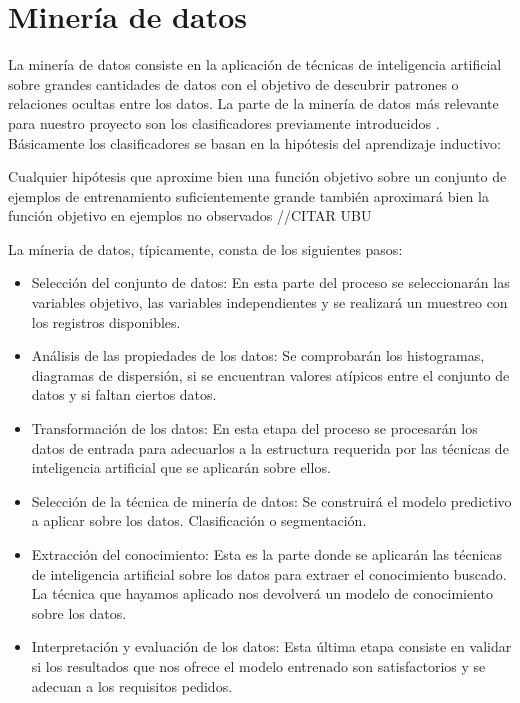 \section{Minería de datos}

La minería de datos consiste en la aplicación de técnicas de inteligencia artificial sobre grandes cantidades de datos con el objetivo de descubrir patrones o relaciones ocultas entre los datos. La parte de la minería de datos más relevante para nuestro proyecto son los clasificadores previamente introducidos \cite{procesosMineriaDatos}. Básicamente los clasificadores se basan en la hipótesis del aprendizaje inductivo:

Cualquier hipótesis que aproxime bien una función objetivo sobre un conjunto de ejemplos de entrenamiento suficientemente grande también aproximará bien la función objetivo en ejemplos no observados //CITAR UBU

La míneria de datos, típicamente, consta de los siguientes pasos:
\begin{itemize}
	\item{Selección del conjunto de datos}: En esta parte del proceso se seleccionarán las variables objetivo, las variables independientes y se realizará un muestreo con los registros disponibles.
	\item{Análisis de las propiedades de los datos}: Se comprobarán los histogramas, diagramas de dispersión, si se encuentran valores atípicos entre el conjunto de datos y si faltan ciertos datos.
	\item{Transformación de los datos}: En esta etapa del proceso se procesarán los datos de entrada para adecuarlos a la estructura requerida por las técnicas de inteligencia artificial que se aplicarán sobre ellos.
	\item{Selección de la técnica de minería de datos}: Se construirá el modelo predictivo a aplicar sobre los datos. Clasificación o segmentación.
	\item{Extracción del conocimiento}: Esta es la parte donde se aplicarán las técnicas de inteligencia artificial sobre los datos para extraer el conocimiento buscado. La técnica que hayamos aplicado nos devolverá un modelo de conocimiento sobre los datos.
	\item{Interpretación y evaluación de los datos}: Esta última etapa consiste en validar si los resultados que nos ofrece el modelo entrenado son satisfactorios y se adecuan a los requisitos pedidos.
\end{itemize}

